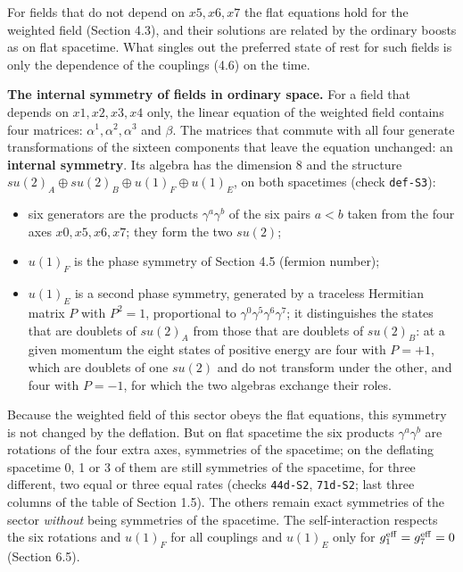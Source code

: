 \documentclass[
  10pt,
]{article}
\providecommand{\tightlist}{%
  \setlength{\itemsep}{0pt}\setlength{\parskip}{0pt}}
\begin{document}
For fields that do not depend on \(x5,x6,x7\) the flat equations hold
for the weighted field (Section 4.3), and their solutions are related by
the ordinary boosts as on flat spacetime. What singles out the preferred
state of rest for such fields is only the dependence of the couplings
(4.6) on the time.

\textbf{The internal symmetry of fields in ordinary space.} For a field
that depends on \(x1,x2,x3,x4\) only, the linear equation of the
weighted field contains four matrices: \(\alpha^1,\alpha^2,\alpha^3\)
and \(\beta\). The matrices that commute with all four generate
transformations of the sixteen components that leave the equation
unchanged: an \textbf{internal symmetry}. Its algebra has the dimension
8 and the structure \(su(2)_A\oplus su(2)_B\oplus u(1)_F\oplus u(1)_E\),
on both spacetimes (check \texttt{def-S3}):

\begin{itemize}
\tightlist
\item
  six generators are the products \(\gamma^a\gamma^b\) of the six pairs
  \(a<b\) taken from the four axes \(x0,x5,x6,x7\); they form the two
  \(su(2)\);
\item
  \(u(1)_F\) is the phase symmetry of Section 4.5 (fermion number);
\item
  \(u(1)_E\) is a second phase symmetry, generated by a traceless
  Hermitian matrix \(P\) with \(P^2=1\), proportional to
  \(\gamma^0\gamma^5\gamma^6\gamma^7\); it distinguishes the states that
  are doublets of \(su(2)_A\) from those that are doublets of
  \(su(2)_B\): at a given momentum the eight states of positive energy
  are four with \(P=+1\), which are doublets of one \(su(2)\) and do not
  transform under the other, and four with \(P=-1\), for which the two
  algebras exchange their roles.
\end{itemize}

Because the weighted field of this sector obeys the flat equations, this
symmetry is not changed by the deflation. But on flat spacetime the six
products \(\gamma^a\gamma^b\) are rotations of the four extra axes,
symmetries of the spacetime; on the deflating spacetime 0, 1 or 3 of
them are still symmetries of the spacetime, for three different, two
equal or three equal rates (checks \texttt{44d-S2}, \texttt{71d-S2};
last three columns of the table of Section 1.5). The others remain exact
symmetries of the sector \emph{without} being symmetries of the
spacetime. The self-interaction respects the six rotations and
\(u(1)_F\) for all couplings and \(u(1)_E\) only for
\(g_1^{\rm eff}=g_7^{\rm eff}=0\) (Section 6.5).
\end{document}

